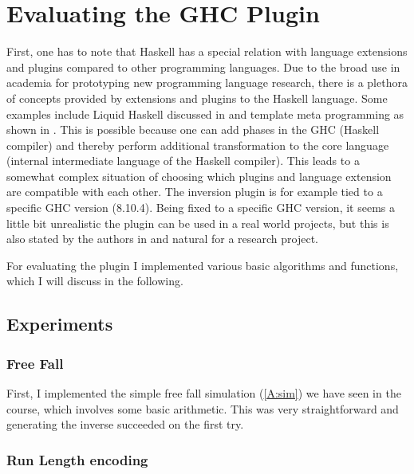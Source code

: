 \documentclass[12pt,a4paper, dvipsnames,usenames]{article}
\begin{document}
\section{Evaluating the GHC Plugin}

First, one has to note that Haskell has a special relation
with language extensions and plugins compared to other programming languages.
Due to the broad use in academia for prototyping new programming language research,
there is a plethora of concepts provided by extensions and
plugins to the Haskell language. Some examples include
Liquid Haskell discussed in \cite{Vazou2016LiquidHH} and
template meta programming as shown in \cite{sheard2002template}.
This is possible because one can add phases in the GHC (Haskell compiler)
and thereby perform additional transformation to the core language
(internal intermediate language of the Haskell compiler).
This leads to a somewhat complex situation of choosing
which plugins and language extension are compatible with each other.
The inversion plugin is for example tied to a specific GHC version (8.10.4).
Being fixed to a specific GHC version, it seems a little bit unrealistic
the plugin can be used in a real world projects, but this is also stated by the
authors in \cite{teegen2021haskell} and natural for a research project.

For evaluating the plugin I implemented various basic algorithms
and functions, which I will discuss in the following.

\subsection{Experiments}

\subsubsection{Free Fall}

First, I implemented the simple free fall simulation (\cref{A:sim})
we have seen in the course, which involves some basic arithmetic.
This was very straightforward and generating the inverse succeeded
on the first try.

\subsubsection{Run Length encoding}
\end{document}
